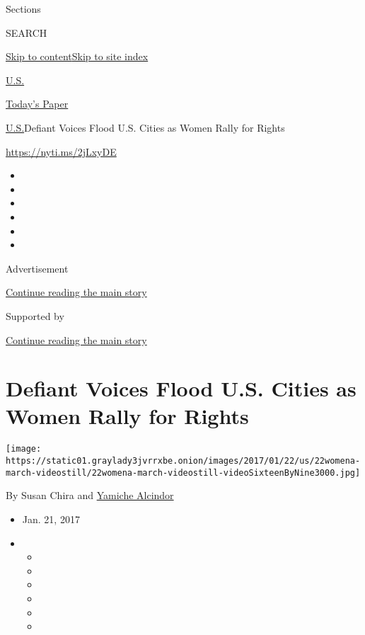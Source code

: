 Sections

SEARCH

\protect\hyperlink{site-content}{Skip to
content}\protect\hyperlink{site-index}{Skip to site index}

\href{https://www.nytimes3xbfgragh.onion/section/us}{U.S.}

\href{https://myaccount.nytimes3xbfgragh.onion/auth/login?response_type=cookie\&client_id=vi}{}

\href{https://www.nytimes3xbfgragh.onion/section/todayspaper}{Today's
Paper}

\href{/section/us}{U.S.}\textbar{}Defiant Voices Flood U.S. Cities as
Women Rally for Rights

\url{https://nyti.ms/2jLxyDE}

\begin{itemize}
\item
\item
\item
\item
\item
\item
\end{itemize}

Advertisement

\protect\hyperlink{after-top}{Continue reading the main story}

Supported by

\protect\hyperlink{after-sponsor}{Continue reading the main story}

\hypertarget{defiant-voices-flood-us-cities-as-women-rally-for-rights}{%
\section{Defiant Voices Flood U.S. Cities as Women Rally for
Rights}\label{defiant-voices-flood-us-cities-as-women-rally-for-rights}}

\texttt{[image: https://static01.graylady3jvrrxbe.onion/images/2017/01/22/us/22womena-march-videostill/22womena-march-videostill-videoSixteenByNine3000.jpg]}

By Susan Chira and
\href{http://www.nytimes3xbfgragh.onion/by/yamiche-alcindor}{Yamiche
Alcindor}

\begin{itemize}
\item
  Jan. 21, 2017
\item
  \begin{itemize}
  \item
  \item
  \item
  \item
  \item
  \item
  \end{itemize}
\end{itemize}

